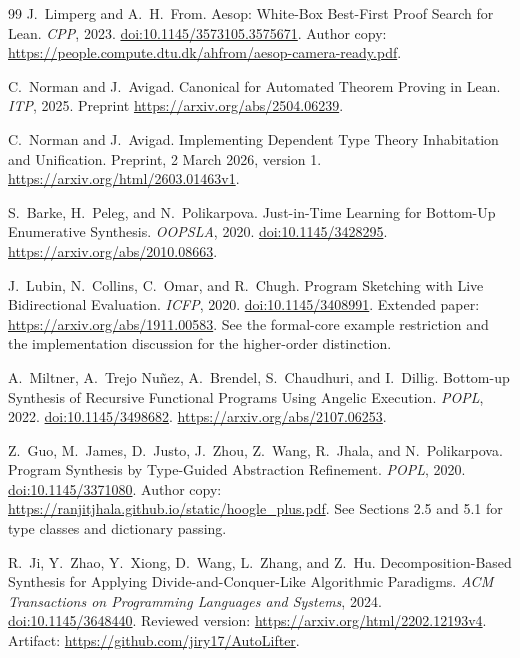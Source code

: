 \documentclass[11pt,a4paper]{article}
\theoremstyle{definition}
\theoremstyle{remark}
\begin{document}
\begin{thebibliography}{99}
J.~Limperg and A.~H.~From.
Aesop: White-Box Best-First Proof Search for Lean.
\emph{CPP}, 2023.
\href{https://doi.org/10.1145/3573105.3575671}{doi:10.1145/3573105.3575671}.
Author copy: \url{https://people.compute.dtu.dk/ahfrom/aesop-camera-ready.pdf}.

C.~Norman and J.~Avigad.
Canonical for Automated Theorem Proving in Lean.
\emph{ITP}, 2025. Preprint \url{https://arxiv.org/abs/2504.06239}.

C.~Norman and J.~Avigad.
Implementing Dependent Type Theory Inhabitation and Unification.
Preprint, 2 March 2026, version 1.
\url{https://arxiv.org/html/2603.01463v1}.

S.~Barke, H.~Peleg, and N.~Polikarpova.
Just-in-Time Learning for Bottom-Up Enumerative Synthesis.
\emph{OOPSLA}, 2020.
\href{https://doi.org/10.1145/3428295}{doi:10.1145/3428295}.
\url{https://arxiv.org/abs/2010.08663}.

J.~Lubin, N.~Collins, C.~Omar, and R.~Chugh.
Program Sketching with Live Bidirectional Evaluation.
\emph{ICFP}, 2020.
\href{https://doi.org/10.1145/3408991}{doi:10.1145/3408991}.
Extended paper: \url{https://arxiv.org/abs/1911.00583}.
See the formal-core example restriction and the implementation discussion
for the higher-order distinction.

A.~Miltner, A.~Trejo Nu\~nez, A.~Brendel, S.~Chaudhuri, and I.~Dillig.
Bottom-up Synthesis of Recursive Functional Programs Using Angelic Execution.
\emph{POPL}, 2022.
\href{https://doi.org/10.1145/3498682}{doi:10.1145/3498682}.
\url{https://arxiv.org/abs/2107.06253}.

Z.~Guo, M.~James, D.~Justo, J.~Zhou, Z.~Wang, R.~Jhala, and N.~Polikarpova.
Program Synthesis by Type-Guided Abstraction Refinement.
\emph{POPL}, 2020.
\href{https://doi.org/10.1145/3371080}{doi:10.1145/3371080}.
Author copy: \url{https://ranjitjhala.github.io/static/hoogle_plus.pdf}.
See Sections 2.5 and 5.1 for type classes and dictionary passing.

R.~Ji, Y.~Zhao, Y.~Xiong, D.~Wang, L.~Zhang, and Z.~Hu.
Decomposition-Based Synthesis for Applying Divide-and-Conquer-Like Algorithmic
Paradigms. \emph{ACM Transactions on Programming Languages and Systems}, 2024.
\href{https://doi.org/10.1145/3648440}{doi:10.1145/3648440}.
Reviewed version: \url{https://arxiv.org/html/2202.12193v4}.
Artifact: \url{https://github.com/jiry17/AutoLifter}.


\end{thebibliography}
\end{document}
